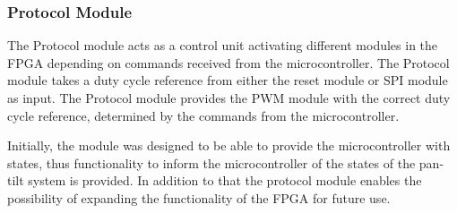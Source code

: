 \documentclass[../../main.tex]{subfiles}
\begin{document}
 

\subsubsection*{Protocol Module}
The Protocol module acts as a control unit activating different modules in the FPGA depending on commands received from the microcontroller. The Protocol module takes a duty cycle reference from either the reset module or SPI module as input. The Protocol module provides the PWM module with the correct duty cycle reference, determined by the commands from the microcontroller.

Initially, the module was designed to be able to provide the microcontroller with states, thus functionality to inform the microcontroller of the states of the pan-tilt system is provided. In addition to that the protocol module enables the possibility of expanding the functionality of the FPGA for future use.





\end{document}
